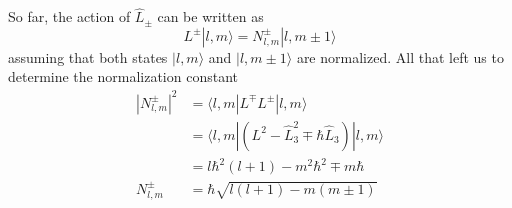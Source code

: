 \documentclass[../../../main.tex]{subfiles}
\begin{document}
So far, the action of $\hat{L}_\pm$ can be written as
\begin{equation*}
    L^{\pm} |l,m\rangle = N^{\pm}_{l,m} |l,m \pm 1\rangle
\end{equation*}
assuming that both states $|l,m\rangle$ and $|l,m \pm 1\rangle$ are normalized.
All that left us to determine the normalization constant
\begin{align*}
    |N^{\pm}_{l,m}|^2
     & = \langle l,m|L^{\mp}L^{\pm}|l,m\rangle                              \\
     & =  \langle l,m| (L^2 - \hat{L}_3^2 \mp \hbar  \hat{L}_3) |l,m\rangle \\
     & =  l \hbar^2 (l + 1) - m^2 \hbar ^2 \mp m \hbar                      \\
    N^{\pm}_{l,m}
     & = \hbar \sqrt{l(l + 1) - m(m \pm 1)}
\end{align*}
\end{document}
